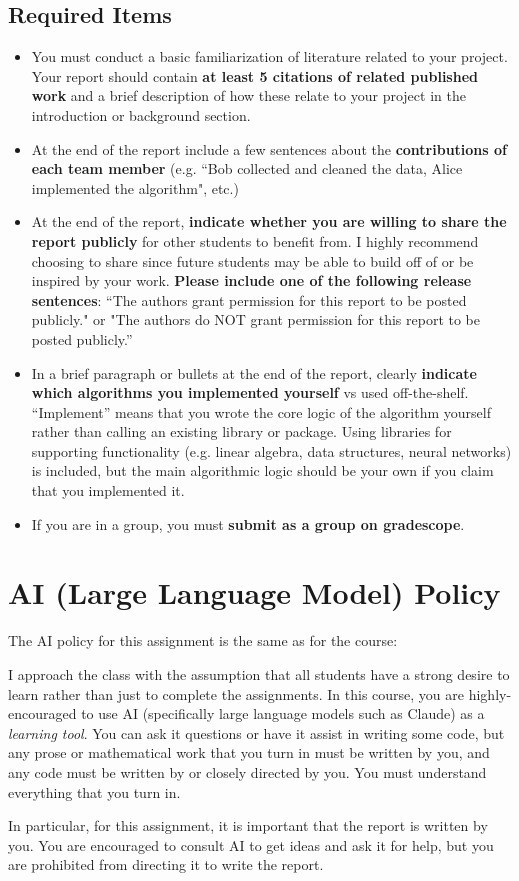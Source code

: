 \documentclass{article}
\begin{document}
\subsection*{Required Items}
\begin{itemize}
    \item You must conduct a basic familiarization of literature related to your project. Your report should contain \textbf{at least 5 citations of related published work} and a brief description of how these relate to your project in the introduction or background section.
    \item At the end of the report include a few sentences about the \textbf{contributions of each team member} (e.g. ``Bob collected and cleaned the data, Alice implemented the algorithm", etc.)
    \item At the end of the report, \textbf{indicate whether you are willing to share the report publicly} for other students to benefit from. I highly recommend choosing to share since future students may be able to build off of or be inspired by your work. \textbf{Please include one of the following release sentences}: ``The authors grant permission for this report to be posted publicly." or "The authors do NOT grant permission for this report to be posted publicly.''
    \item In a brief paragraph or bullets at the end of the report, clearly \textbf{indicate which algorithms you implemented yourself} vs used off-the-shelf. ``Implement'' means that you wrote the core logic of the algorithm yourself rather than calling an existing library or package. Using libraries for supporting functionality (e.g. linear algebra, data structures, neural networks) is included, but the main algorithmic logic should be your own if you claim that you implemented it.
    \item If you are in a group, you must \textbf{submit as a group on gradescope}.
\end{itemize}

\section*{AI (Large Language Model) Policy}

The AI policy for this assignment is the same as for the course:

I approach the class with the assumption that all students have a strong desire to learn rather than just to complete the assignments. In this course, you are highly-encouraged to use AI (specifically large language models such as Claude) as a \emph{learning tool}. You can ask it questions or have it assist in writing some code, but any prose or mathematical work that you turn in must be written by you, and any code must be written by or closely directed by you. You must understand everything that you turn in.

In particular, for this assignment, it is important that the report is written by you. You are encouraged to consult AI to get ideas and ask it for help, but you are prohibited from directing it to write the report.
\end{document}
